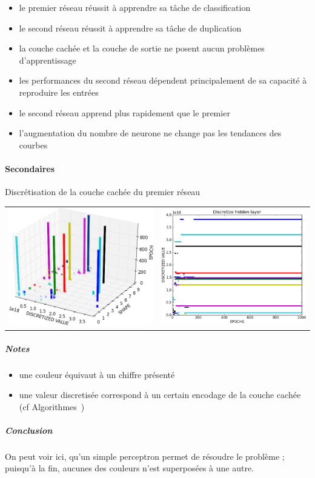 	\begin{itemize}
	  \item le premier réseau réussit à apprendre sa tâche de classification
	  \item le second réseau réussit à apprendre sa tâche de duplication
	  \item la couche cachée et la couche de sortie ne posent aucun problèmes d'apprentissage
	  \item les performances du second réseau dépendent principalement de sa capacité à reproduire les entrées
	  \item le second réseau apprend plus rapidement que le premier
	  \item l'augmentation du nombre de neurone ne change pas les tendances des courbes
	\end{itemize}
    \paragraph{Secondaires}
      Discrétisation de la couche cachée du premier réseau
      \begin{center}
	\begin{tabular}{lr}
	  \hspace*{-1cm}
	  \includegraphics[width=250px]{data/expA2/discretize_cloud.png}
	  &
	  \includegraphics[width=250px]{data/expA2/discretize.png} 
	\end{tabular}
      \end{center} 
      \subparagraph{Notes}
	\begin{itemize}
	  \item une couleur équivaut à un chiffre présenté
	  \item une valeur discretisée correspond à un certain encodage de la couche cachée (cf Algorithmes~)
	\end{itemize}
      \subparagraph{Conclusion}
	On peut voir ici, qu'un simple perceptron permet de résoudre le problème ; puisqu'à la fin,
        aucunes des couleurs n'est superposées à une autre.
      
